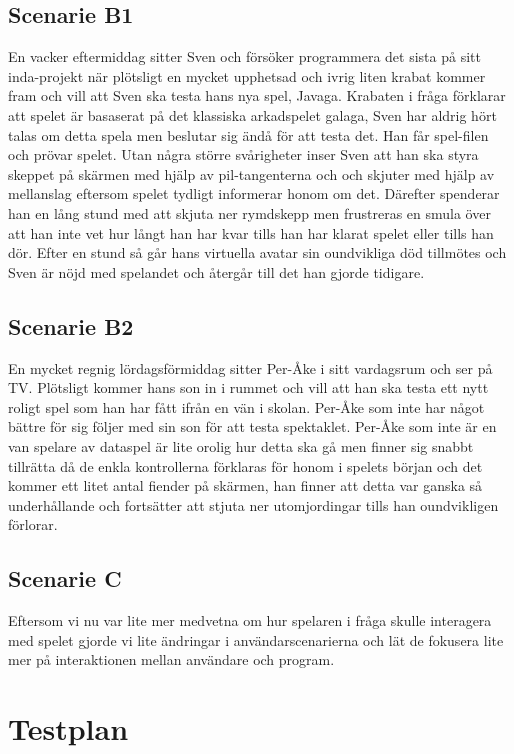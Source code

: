 \documentclass[a4paper,11pt]{article}
\begin{document}
\subsection{Scenarie B1}
En vacker eftermiddag sitter Sven och försöker programmera det sista på sitt inda-projekt när plötsligt en mycket upphetsad och ivrig liten krabat kommer fram och vill att Sven ska testa hans nya spel, Javaga. Krabaten i fråga förklarar att spelet är basaserat på det klassiska arkadspelet galaga, Sven har aldrig hört talas om detta spela men beslutar sig ändå för att testa det. Han får spel-filen och prövar spelet. Utan några större svårigheter inser Sven att han ska styra skeppet på skärmen med hjälp av pil-tangenterna och och skjuter med hjälp av mellanslag eftersom spelet tydligt informerar honom om det. Därefter spenderar han en lång stund med att skjuta ner rymdskepp men frustreras en smula över att han inte vet hur långt han har kvar tills han har klarat spelet eller tills han dör. Efter en stund så går hans virtuella avatar sin oundvikliga död tillmötes och Sven är nöjd med spelandet och återgår till det han gjorde tidigare.

\subsection{Scenarie B2}
En mycket regnig lördagsförmiddag sitter Per-Åke i sitt vardagsrum och ser på TV. Plötsligt kommer hans son in i rummet och vill att han ska testa ett nytt roligt spel som han har fått ifrån en vän i skolan. Per-Åke som inte har något bättre för sig följer med sin son för att testa spektaklet. Per-Åke som inte är en van spelare av dataspel är lite orolig hur detta ska gå men finner sig snabbt tillrätta då de enkla kontrollerna förklaras för honom i spelets början och det kommer ett litet antal fiender på skärmen, han finner att detta var ganska så underhållande och fortsätter att stjuta ner utomjordingar tills han oundvikligen förlorar.

\subsection{Scenarie C}
Eftersom vi nu var lite mer medvetna om hur spelaren i fråga skulle interagera med spelet gjorde vi lite ändringar i användarscenarierna och lät de fokusera lite mer på interaktionen mellan användare och program.

\section{Testplan}
\end{document}
